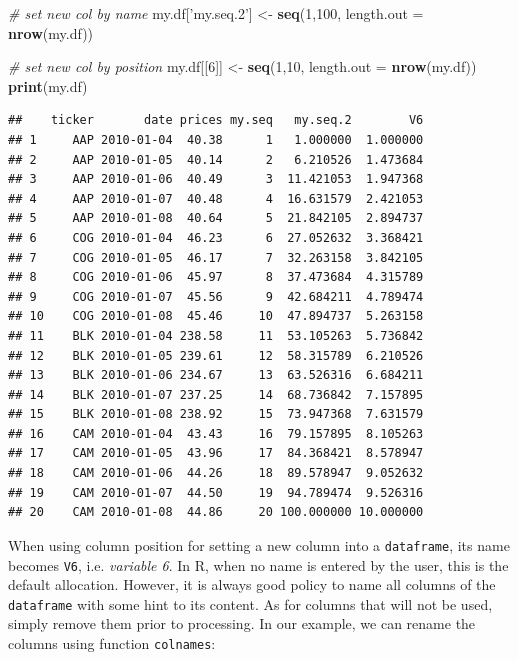 \documentclass[11pt,]{book}
\newenvironment{Shaded}{\begin{snugshade}}{\end{snugshade}}
\newcommand{\KeywordTok}[1]{\textcolor[rgb]{0.27,0.27,0.27}{\textbf{#1}}}
\newcommand{\DataTypeTok}[1]{\textcolor[rgb]{0.27,0.27,0.27}{#1}}
\newcommand{\DecValTok}[1]{\textcolor[rgb]{0.06,0.06,0.06}{#1}}
\newcommand{\StringTok}[1]{\textcolor[rgb]{0.5,0.5,0.5}{#1}}
\newcommand{\CommentTok}[1]{\textcolor[rgb]{0.56,0.35,0.01}{\textit{#1}}}
\newcommand{\NormalTok}[1]{#1}
\begin{document}
\begin{Shaded}
\begin{Highlighting}[]
\CommentTok{# set new col by name}
\NormalTok{my.df[}\StringTok{'my.seq.2'}\NormalTok{] <-}\StringTok{ }\KeywordTok{seq}\NormalTok{(}\DecValTok{1}\NormalTok{,}\DecValTok{100}\NormalTok{, }\DataTypeTok{length.out =} \KeywordTok{nrow}\NormalTok{(my.df))}

\CommentTok{# set new col by position}
\NormalTok{my.df[[}\DecValTok{6}\NormalTok{]] <-}\StringTok{ }\KeywordTok{seq}\NormalTok{(}\DecValTok{1}\NormalTok{,}\DecValTok{10}\NormalTok{, }\DataTypeTok{length.out =} \KeywordTok{nrow}\NormalTok{(my.df))}
\KeywordTok{print}\NormalTok{(my.df)}
\end{Highlighting}
\end{Shaded}

\begin{verbatim}
##    ticker       date prices my.seq   my.seq.2        V6
## 1     AAP 2010-01-04  40.38      1   1.000000  1.000000
## 2     AAP 2010-01-05  40.14      2   6.210526  1.473684
## 3     AAP 2010-01-06  40.49      3  11.421053  1.947368
## 4     AAP 2010-01-07  40.48      4  16.631579  2.421053
## 5     AAP 2010-01-08  40.64      5  21.842105  2.894737
## 6     COG 2010-01-04  46.23      6  27.052632  3.368421
## 7     COG 2010-01-05  46.17      7  32.263158  3.842105
## 8     COG 2010-01-06  45.97      8  37.473684  4.315789
## 9     COG 2010-01-07  45.56      9  42.684211  4.789474
## 10    COG 2010-01-08  45.46     10  47.894737  5.263158
## 11    BLK 2010-01-04 238.58     11  53.105263  5.736842
## 12    BLK 2010-01-05 239.61     12  58.315789  6.210526
## 13    BLK 2010-01-06 234.67     13  63.526316  6.684211
## 14    BLK 2010-01-07 237.25     14  68.736842  7.157895
## 15    BLK 2010-01-08 238.92     15  73.947368  7.631579
## 16    CAM 2010-01-04  43.43     16  79.157895  8.105263
## 17    CAM 2010-01-05  43.96     17  84.368421  8.578947
## 18    CAM 2010-01-06  44.26     18  89.578947  9.052632
## 19    CAM 2010-01-07  44.50     19  94.789474  9.526316
## 20    CAM 2010-01-08  44.86     20 100.000000 10.000000
\end{verbatim}

When using column position for setting a new column into a
\texttt{dataframe}, its name becomes \texttt{V6}, i.e. \emph{variable
6}. In R, when no name is entered by the user, this is the default
allocation. However, it is always good policy to name all columns of the
\texttt{dataframe} with some hint to its content. As for columns that
will not be used, simply remove them prior to processing. In our
example, we can rename the columns using function \texttt{colnames}:
\end{document}
